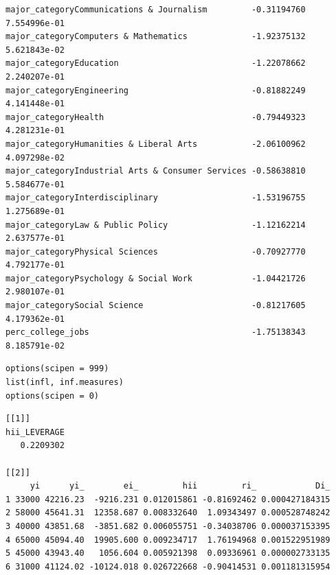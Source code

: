 \documentclass[10pt, twoside, openleft]{article}
\begin{document}
\begin{verbatim}
major_categoryCommunications & Journalism         -0.31194760 7.554996e-01
major_categoryComputers & Mathematics             -1.92375132 5.621843e-02
major_categoryEducation                           -1.22078662 2.240207e-01
major_categoryEngineering                         -0.81882249 4.141448e-01
major_categoryHealth                              -0.79449323 4.281231e-01
major_categoryHumanities & Liberal Arts           -2.06100962 4.097298e-02
major_categoryIndustrial Arts & Consumer Services -0.58638810 5.584677e-01
major_categoryInterdisciplinary                   -1.53196755 1.275689e-01
major_categoryLaw & Public Policy                 -1.12162214 2.637577e-01
major_categoryPhysical Sciences                   -0.70927770 4.792177e-01
major_categoryPsychology & Social Work            -1.04421726 2.980107e-01
major_categorySocial Science                      -0.81217605 4.179362e-01
perc_college_jobs                                 -1.75138343 8.185791e-02
\end{verbatim}

\begin{verbatim}
options(scipen = 999)
list(infl, inf.measures)
options(scipen = 0)
\end{verbatim}

\begin{verbatim}
[[1]]
hii_LEVERAGE
   0.2209302

[[2]]
     yi      yi_        ei_         hii         ri_            Di_
1 33000 42216.23  -9216.231 0.012015861 -0.81692462 0.000427184315
2 58000 45641.31  12358.687 0.008332640  1.09343497 0.000528748242
3 40000 43851.68  -3851.682 0.006055751 -0.34038706 0.000037153395
4 65000 45094.40  19905.600 0.009234717  1.76194968 0.001522951989
5 45000 43943.40   1056.604 0.005921398  0.09336961 0.000002733135
6 31000 41124.02 -10124.018 0.026722668 -0.90414531 0.001181315954
\end{verbatim}
\end{document}
